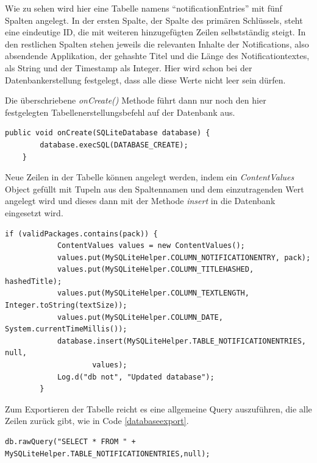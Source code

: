Wie zu sehen wird hier eine Tabelle namens "`notificationEntries"' mit fünf Spalten angelegt.
In der ersten Spalte, der Spalte des primären Schlüssels, steht eine eindeutige ID, die mit weiteren hinzugefügten Zeilen selbstständig steigt.
In den restlichen Spalten stehen jeweils die relevanten Inhalte der Notifications, also absendende Applikation, der gehashte Titel und die Länge des Notificationtextes, als String und der Timestamp als Integer. 
Hier wird schon bei der Datenbankerstellung festgelegt, dass alle diese Werte nicht leer sein dürfen.

Die überschriebene \emph{onCreate()} Methode führt dann nur noch den hier festgelegten Tabellenerstellungsbefehl auf der Datenbank aus.

\begin{lstlisting}[frame=single, caption = onCreate Methode, label=databaseoncreate] 
  public void onCreate(SQLiteDatabase database) {
        database.execSQL(DATABASE_CREATE);
    } 
\end{lstlisting}

Neue Zeilen in der Tabelle können angelegt werden, indem ein \emph{ContentValues} Object gefüllt 
mit Tupeln aus den Spaltennamen und dem einzutragenden Wert angelegt wird und dieses dann mit der Methode \emph{insert} in die Datenbank eingesetzt wird.

\begin{lstlisting}[frame=single, caption = Einfügen in die Datenbank, label=databaseinsert] 
if (validPackages.contains(pack)) {
            ContentValues values = new ContentValues();
            values.put(MySQLiteHelper.COLUMN_NOTIFICATIONENTRY, pack);
            values.put(MySQLiteHelper.COLUMN_TITLEHASHED, hashedTitle);
            values.put(MySQLiteHelper.COLUMN_TEXTLENGTH, Integer.toString(textSize));
            values.put(MySQLiteHelper.COLUMN_DATE, System.currentTimeMillis());
            database.insert(MySQLiteHelper.TABLE_NOTIFICATIONENTRIES, null,
                    values);
            Log.d("db not", "Updated database");
        }
\end{lstlisting}

Zum Exportieren der Tabelle reicht es eine allgemeine Query auszuführen, die alle Zeilen zurück gibt, wie in Code 
\ref{databaseexport}.

\begin{lstlisting}[frame=single, caption = Einfügen in die Datenbank, label=databaseexport] 
  db.rawQuery("SELECT * FROM " + MySQLiteHelper.TABLE_NOTIFICATIONENTRIES,null); 
\end{lstlisting}

